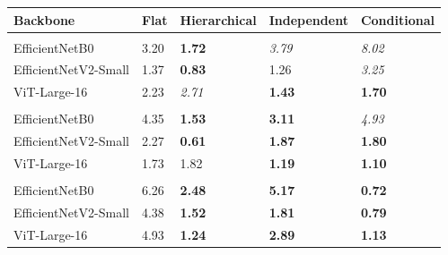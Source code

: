 
\begin{tabular}{lllll}
\toprule
Backbone & Flat & Hierarchical & Independent & Conditional\\
\midrule
\addlinespace[0.3em]
\multicolumn{5}{l}{\textbf{Species}}\\
\hspace{1em}EfficientNetB0 & 3.20 & \textbf{1.72} & \textit{3.79} & \textit{8.02}\\
\hspace{1em}EfficientNetV2-Small & 1.37 & \textbf{0.83} & 1.26 & \textit{3.25}\\
\hspace{1em}ViT-Large-16 & 2.23 & \textit{2.71} & \textbf{1.43} & \textbf{1.70}\\
\addlinespace[0.3em]
\multicolumn{5}{l}{\textbf{Genus}}\\
\hspace{1em}EfficientNetB0 & 4.35 & \textbf{1.53} & \textbf{3.11} & \textit{4.93}\\
\hspace{1em}EfficientNetV2-Small & 2.27 & \textbf{0.61} & \textbf{1.87} & \textbf{1.80}\\
\hspace{1em}ViT-Large-16 & 1.73 & 1.82 & \textbf{1.19} & \textbf{1.10}\\
\addlinespace[0.3em]
\multicolumn{5}{l}{\textbf{Family}}\\
\hspace{1em}EfficientNetB0 & 6.26 & \textbf{2.48} & \textbf{5.17} & \textbf{0.72}\\
\hspace{1em}EfficientNetV2-Small & 4.38 & \textbf{1.52} & \textbf{1.81} & \textbf{0.79}\\
\hspace{1em}ViT-Large-16 & 4.93 & \textbf{1.24} & \textbf{2.89} & \textbf{1.13}\\
\bottomrule
\end{tabular}

